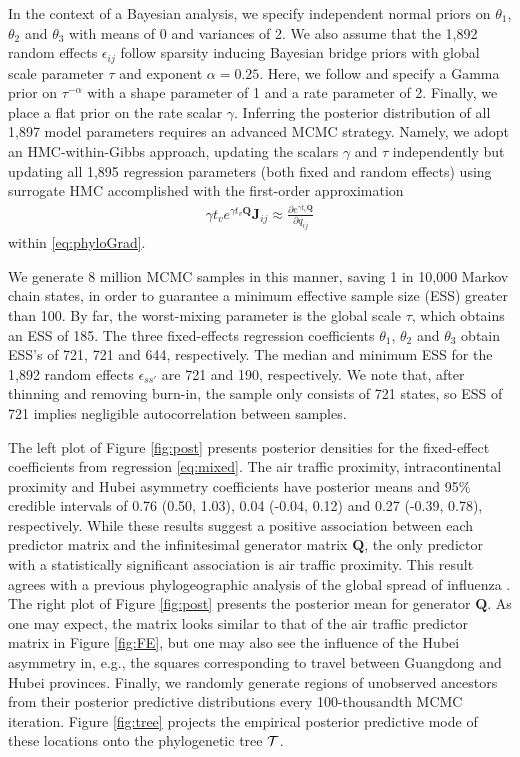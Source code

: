 \documentclass[9pt,twocolumn,twoside]{pnas-new}
\newcommand{\phylogeny}{{\cal T}}
\newcommand{\?}{\textbf{?}}
\newcommand{\QQ}{\mathbf{Q}}
\newcommand{\JJ}{\mathbf{J}}
\begin{document}
In the context of a Bayesian analysis, we specify independent normal
priors on $\theta_1$, $\theta_2$ and $\theta_3$ with means of 0 and
variances of 2.  We also assume that the 1,892 random effects
$\epsilon_{ij}$ follow sparsity inducing Bayesian bridge priors with
global scale parameter $\tau$ and exponent $\alpha=0.25$.  Here, we
follow \cite{nishimura2022shrinkage} and specify a Gamma prior on
$\tau^{-\alpha}$ with a shape parameter of 1 and a rate parameter of
2. Finally, we place a flat prior on the rate scalar $\gamma$.
Inferring the posterior distribution of all 1,897 model parameters
requires an advanced MCMC strategy. Namely, we adopt an
HMC-within-Gibbs approach, updating the scalars $\gamma$ and $\tau$
independently but updating all 1,895 regression parameters (both fixed
and random effects) using surrogate HMC accomplished with the
first-order approximation
\begin{align*}
  \gamma t_v  e^{\gamma t_v \QQ} \JJ_{ij}
  \approx \frac{\partial e^{\gamma t_v \QQ}}{\partial q_{ij}} 
\end{align*}
within \eqref{eq:phyloGrad}.

We generate 8 million MCMC samples in this manner, saving 1 in 10,000
Markov chain states, in order to guarantee a minimum effective sample
size (ESS) greater than 100.  By far, the worst-mixing parameter is
the global scale $\tau$, which obtains an ESS of 185.  The three
fixed-effects regression coefficients $\theta_1$, $\theta_2$ and
$\theta_3$ obtain ESS's of 721, 721 and 644, respectively.  The median
and minimum ESS for the 1,892 random effects $\epsilon_{ss'}$ are 721
and 190, respectively.  We note that, after thinning and removing
burn-in, the sample only consists of 721 states, so ESS of 721 implies
negligible autocorrelation between samples.

The left plot of Figure \ref{fig:post} presents posterior densities
for the fixed-effect coefficients from regression \eqref{eq:mixed}.
The air traffic proximity, intracontinental proximity and Hubei
asymmetry coefficients have posterior means and 95\% credible
intervals of 0.76 (0.50, 1.03), 0.04 (-0.04, 0.12) and 0.27 (-0.39,
0.78), respectively. While these results suggest a positive
association between each predictor matrix and the infinitesimal
generator matrix $\QQ$, the only predictor with a statistically
significant association is air traffic proximity.  This result agrees
with a previous phylogeographic analysis of the global spread of
influenza \cite{holbrook2021massive}.  The right plot of Figure
\ref{fig:post} presents the posterior mean for generator $\QQ$.  As
one may expect, the matrix looks similar to that of the air traffic
predictor matrix in Figure \ref{fig:FE}, but one may also see the
influence of the Hubei asymmetry in, e.g., the squares corresponding
to travel between Guangdong and Hubei provinces.  Finally, we randomly
generate regions of unobserved ancestors from their posterior
predictive distributions every 100-thousandth MCMC iteration.
Figure \ref{fig:tree} projects the empirical posterior predictive mode
of these locations onto the phylogenetic tree $\phylogeny$.
\end{document}
